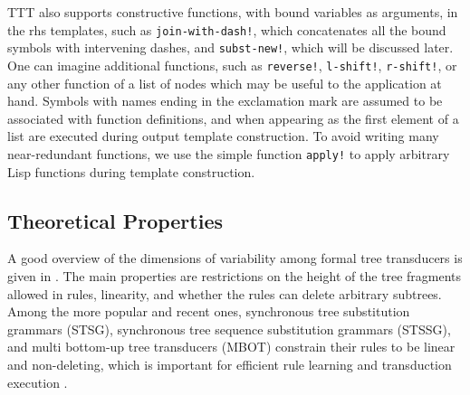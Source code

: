 \documentclass[a4,11pt]{article}
\begin{document}
TTT also supports constructive functions, with bound variables as arguments, in the rhs templates, such as \texttt{join-with-dash!}, which concatenates all the bound symbols with intervening dashes, and \texttt{subst-new!}, which will be discussed later. One can imagine additional functions, such as \texttt{reverse!}, \texttt{l-shift!}, \texttt{r-shift!}, or any other function of a list of nodes which may be useful to the application at hand.  Symbols with names ending in the exclamation mark are assumed to be associated with function definitions, and when appearing as the first element of a list are executed during output template construction.  To avoid writing many near-redundant functions, we use the simple function \texttt{apply!} to apply arbitrary Lisp functions during template construction.


\subsection*{Theoretical Properties} 

A good overview of the dimensions of variability among formal tree transducers is given in \cite{Knight:2007}. The main properties are restrictions on the height of the tree fragments allowed in rules, linearity, and whether the rules can delete arbitrary subtrees.  Among the more popular and recent ones, synchronous tree substitution grammars (STSG), synchronous tree sequence substitution grammars (STSSG), and multi bottom-up tree transducers (MBOT)  constrain their rules to be linear and non-deleting, which is important for efficient rule learning and transduction execution \cite{Chiang:2004,Galley:2004,Yamada-Knight:2001,Zhang:2008,Maletti:2010}.  
\end{document}
